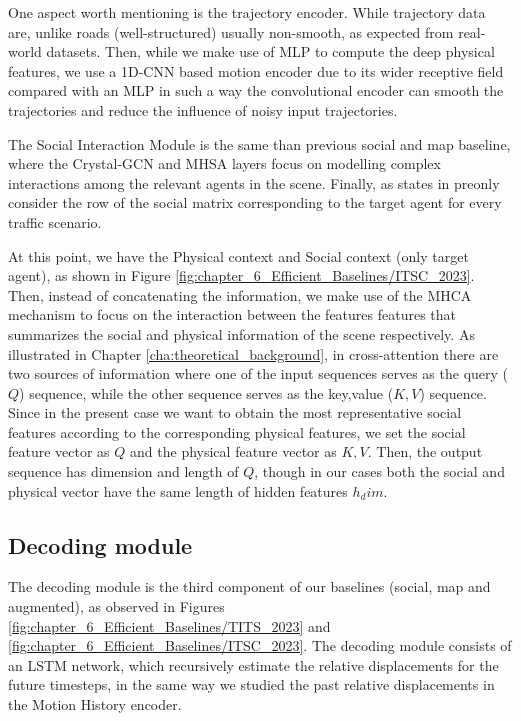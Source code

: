 One aspect worth mentioning is the trajectory encoder. While trajectory data are, unlike roads (well-structured) usually non-smooth, as expected from real-world datasets. Then, while we make use of \ac{MLP} to compute the deep physical features, we use a 1D-\ac{CNN} based motion encoder due to its wider receptive field compared with an \ac{MLP} in such a way the convolutional encoder can smooth the trajectories and reduce the influence of noisy input trajectories.

The Social Interaction Module is the same than previous social and map baseline, where the Crystal-\ac{GCN} and \ac{MHSA} layers focus on modelling complex interactions among the relevant agents in the scene. Finally, as states in preonly consider the row of the social matrix corresponding to the target agent for every traffic scenario.

At this point, we have the Physical context and Social context (only target agent), as shown in Figure \ref{fig:chapter_6_Efficient_Baselines/ITSC_2023}. Then, instead of concatenating the information, we make use of the \ac{MHCA} mechanism to focus on the interaction between the features features that summarizes the social and physical information of the scene respectively. As illustrated in Chapter \ref{cha:theoretical_background}, in cross-attention there are two sources of information where one of the input sequences serves as the query ($Q$) sequence, while the other sequence serves as the key,value ($K,V$) sequence. Since in the present case we want to obtain the most representative social features according to the corresponding physical features, we set the social feature vector as $Q$ and the physical feature vector as $K,V$. Then, the output sequence has dimension and length of $Q$, though in our cases both the social and physical vector have the same length of hidden features $h_dim$.

\subsection{Decoding module}
\label{subsubsec:6_efficient_baselines_decoding_modules}

The decoding module is the third component of our baselines (social, map and augmented), as observed in Figures \ref{fig:chapter_6_Efficient_Baselines/TITS_2023} and \ref{fig:chapter_6_Efficient_Baselines/ITSC_2023}. The decoding module consists of an \ac{LSTM} network, which recursively estimate the relative displacements for the future timesteps, in the same way we studied the past relative displacements in the Motion History encoder. 

